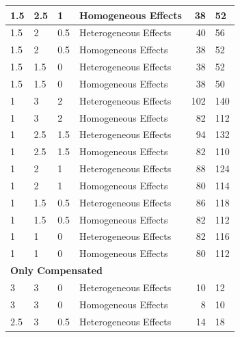 \documentclass[
]{article}
\begin{document}
\begin{table}[H]
\begin{tabular}{l|l|l|l|r|l}
\hline
\hspace{1em}1.5 & 2.5 & 1 & Homogeneous Effects & 38 & 52\\
\hline
\hspace{1em}1.5 & 2 & 0.5 & Heterogeneous Effects & 40 & 56\\
\hline
\hspace{1em}1.5 & 2 & 0.5 & Homogeneous Effects & 38 & 52\\
\hline
\hspace{1em}1.5 & 1.5 & 0 & Heterogeneous Effects & 38 & 52\\
\hline
\hspace{1em}1.5 & 1.5 & 0 & Homogeneous Effects & 38 & 50\\
\hline
\hspace{1em}1 & 3 & 2 & Heterogeneous Effects & 102 & 140\\
\hline
\hspace{1em}1 & 3 & 2 & Homogeneous Effects & 82 & 112\\
\hline
\hspace{1em}1 & 2.5 & 1.5 & Heterogeneous Effects & 94 & 132\\
\hline
\hspace{1em}1 & 2.5 & 1.5 & Homogeneous Effects & 82 & 110\\
\hline
\hspace{1em}1 & 2 & 1 & Heterogeneous Effects & 88 & 124\\
\hline
\hspace{1em}1 & 2 & 1 & Homogeneous Effects & 80 & 114\\
\hline
\hspace{1em}1 & 1.5 & 0.5 & Heterogeneous Effects & 86 & 118\\
\hline
\hspace{1em}1 & 1.5 & 0.5 & Homogeneous Effects & 82 & 112\\
\hline
\hspace{1em}1 & 1 & 0 & Heterogeneous Effects & 82 & 116\\
\hline
\hspace{1em}1 & 1 & 0 & Homogeneous Effects & 80 & 112\\
\hline
\multicolumn{6}{l}{\textbf{Only Compensated}}\\
\hline
\hspace{1em}3 & 3 & 0 & Heterogeneous Effects & 10 & 12\\
\hline
\hspace{1em}3 & 3 & 0 & Homogeneous Effects & 8 & 10\\
\hline
\hspace{1em}2.5 & 3 & 0.5 & Heterogeneous Effects & 14 & 18\\

\end{tabular}
\end{table}
\end{document}
